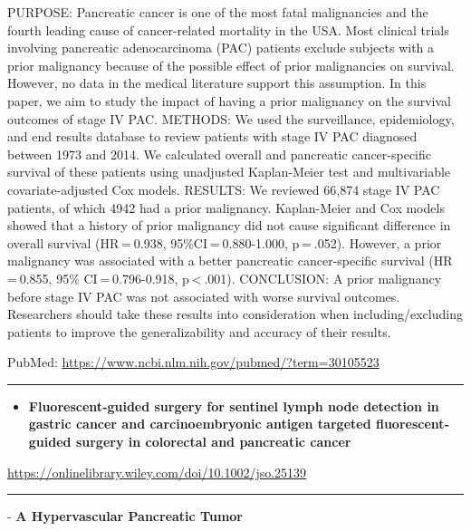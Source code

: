 \documentclass[]{article}
\providecommand{\tightlist}{%
  \setlength{\itemsep}{0pt}\setlength{\parskip}{0pt}}
\begin{document}
PURPOSE: Pancreatic cancer is one of the most fatal malignancies and the
fourth leading cause of cancer-related mortality in the USA. Most
clinical trials involving pancreatic adenocarcinoma (PAC) patients
exclude subjects with a prior malignancy because of the possible effect
of prior malignancies on survival. However, no data in the medical
literature support this assumption. In this paper, we aim to study the
impact of having a prior malignancy on the survival outcomes of stage IV
PAC. METHODS: We used the surveillance, epidemiology, and end results
database to review patients with stage IV PAC diagnosed between 1973 and
2014. We calculated overall and pancreatic cancer-specific survival of
these patients using unadjusted Kaplan-Meier test and multivariable
covariate-adjusted Cox models. RESULTS: We reviewed 66,874 stage IV PAC
patients, of which 4942 had a prior malignancy. Kaplan-Meier and Cox
models showed that a history of prior malignancy did not cause
significant difference in overall survival (HR = 0.938,
95\%CI = 0.880-1.000, p = .052). However, a prior malignancy was
associated with a better pancreatic cancer-specific survival
(HR = 0.855, 95\% CI = 0.796-0.918, p \textless{} .001). CONCLUSION: A
prior malignancy before stage IV PAC was not associated with worse
survival outcomes. Researchers should take these results into
consideration when including/excluding patients to improve the
generalizability and accuracy of their results.

PubMed: \url{https://www.ncbi.nlm.nih.gov/pubmed/?term=30105523}

{}

{}

\begin{center}\rule{0.5\linewidth}{\linethickness}\end{center}

\begin{itemize}
\tightlist
\item
  \textbf{Fluorescent‐guided surgery for sentinel lymph node detection
  in gastric cancer and carcinoembryonic antigen targeted
  fluorescent‐guided surgery in colorectal and pancreatic cancer}
\end{itemize}

\url{https://onlinelibrary.wiley.com/doi/10.1002/jso.25139}

\begin{center}\rule{0.5\linewidth}{\linethickness}\end{center}

 - \textbf{A Hypervascular Pancreatic Tumor}
\end{document}
